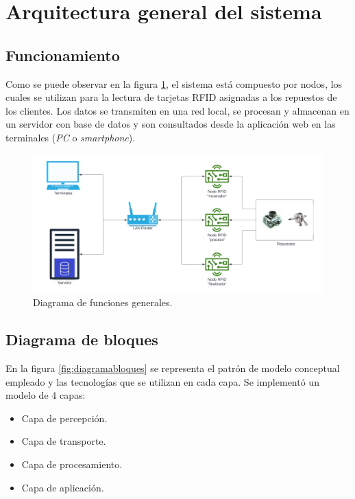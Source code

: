 \section{Arquitectura general del sistema}
\label{sec:arquitecturagral}

\subsection{Funcionamiento}
\label{subsec:funcionamiento}
Como se puede observar en la figura \ref{fig:diagramafunciones}, el sistema está compuesto por nodos, los cuales se utilizan para la lectura de tarjetas RFID asignadas a los repuestos de los clientes. Los datos se transmiten en una red local, se procesan y almacenan en un servidor con base de datos y son consultados desde la aplicación web en las terminales (\textit{PC} o \textit{smartphone}).

\begin{figure}[H]
	\centering
	\includegraphics[scale=.50]{./Figures/diagramafunciones.png}
	\caption{Diagrama de funciones generales.}
	\label{fig:diagramafunciones}
\end{figure}

\subsection{Diagrama de bloques}
\label{subsec:diagramabloques}
En la figura \ref{fig:diagramabloques} se representa el patrón de modelo conceptual empleado y las tecnologías que se utilizan en cada capa. Se implementó un modelo de 4 capas: 

\begin{itemize}
\item Capa de percepción.
\item Capa de transporte.
\item Capa de procesamiento.
\item Capa de aplicación.
\end{itemize}


